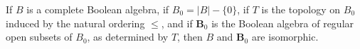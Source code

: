 If $B$ is a complete Boolean algebra, if $B_0 = |B| - \{0\}$, if $T$ is the topology on $B_0$ induced by the natural ordering $\leq$, and if $\mathbf{B}_0$ is the Boolean algebra of regular open subsets of $B_0$, as determined by $T$, then $B$ and $\mathbf{B}_0$ are isomorphic.
